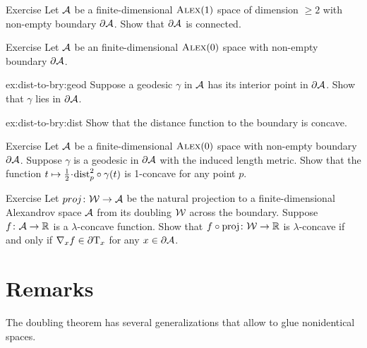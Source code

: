 \begin{thm}{Exercise}\label{ex:bry-connected}
Let $\mathcal{A}$ be a finite-dimensional $\textsc{Alex}(1)$ space of dimension $\ge 2$ with non-empty boundary $\partial\mathcal{A}$.
Show that $\partial\mathcal{A}$ is connected.
\end{thm}



\begin{thm}{Exercise}\label{ex:dist-to-bry}
Let $\mathcal{A}$ be an finite-dimensional $\textsc{Alex}(0)$ space with non-empty boundary $\partial\mathcal{A}$.

\begin{subthm}{ex:dist-to-bry:geod}
Suppose a geodesic $\gamma$ in $\mathcal{A}$ has its interior point in $\partial\mathcal{A}$.
Show that $\gamma$ lies in $\partial\mathcal{A}$.
\end{subthm}


\begin{subthm}{ex:dist-to-bry:dist}
Show that the distance function to the boundary is concave.
\end{subthm}

\end{thm}

\begin{thm}{Exercise}\label{ex:liberman}
Let $\mathcal{A}$ be a finite-dimensional $\textsc{Alex}(0)$ space with non-empty boundary $\partial\mathcal{A}$.
Suppose $\gamma$ is a geodesic in $\partial\mathcal{A}$ with the induced length metric.
Show that the function $t\mapsto \tfrac12\cdot\distfun_p^2\circ\gamma(t)$ is 1-concave for any point $p$. 
\end{thm}

\begin{thm}{Exercise}\label{ex:native}
Let $proj\colon\mathcal{W}\to\mathcal{A}$ be the natural projection to a finite-dimensional Alexandrov space $\mathcal{A}$ from its doubling $\mathcal{W}$ across the boundary.
Suppose $f\colon\mathcal{A}\to\mathbb{R}$ is a $\lambda$-concave function.
Show that $f\circ\operatorname{\rm proj}\nolimits\colon\mathcal{W}\to\mathbb{R}$ is $\lambda$-concave if and only if $\nabla_xf\in \partial \mathrm{T}_x$ 
for any $x\in\partial \mathcal{A}$.
\end{thm}



\section{Remarks}\label{sec:bry-remarks}

The doubling theorem has several generalizations \cite{petrunin1997,ge-li} that allow to glue nonidentical spaces.

